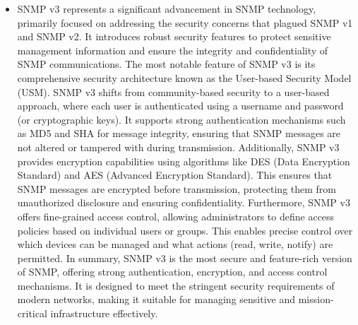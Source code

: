 \documentclass{article}
\begin{document}
\begin{itemize}
	\item[] SNMP v3 represents a significant advancement in SNMP technology, primarily focused on addressing the security concerns that plagued SNMP v1 and SNMP v2. It introduces robust security features to protect sensitive management information and ensure the integrity and confidentiality of SNMP communications. The most notable feature of SNMP v3 is its comprehensive security architecture known as the User-based Security Model (USM). SNMP v3 shifts from community-based security to a user-based approach, where each user is authenticated using a username and password (or cryptographic keys). It supports strong authentication mechanisms such as MD5 and SHA for message integrity, ensuring that SNMP messages are not altered or tampered with during transmission. Additionally, SNMP v3 provides encryption capabilities using algorithms like DES (Data Encryption Standard) and AES (Advanced Encryption Standard). This ensures that SNMP messages are encrypted before transmission, protecting them from unauthorized disclosure and ensuring confidentiality. Furthermore, SNMP v3 offers fine-grained access control, allowing administrators to define access policies based on individual users or groups. This enables precise control over which devices can be managed and what actions (read, write, notify) are permitted. In summary, SNMP v3 is the most secure and feature-rich version of SNMP, offering strong authentication, encryption, and access control mechanisms. It is designed to meet the stringent security requirements of modern networks, making it suitable for managing sensitive and mission-critical infrastructure effectively.
  

\end{itemize}
\end{document}
